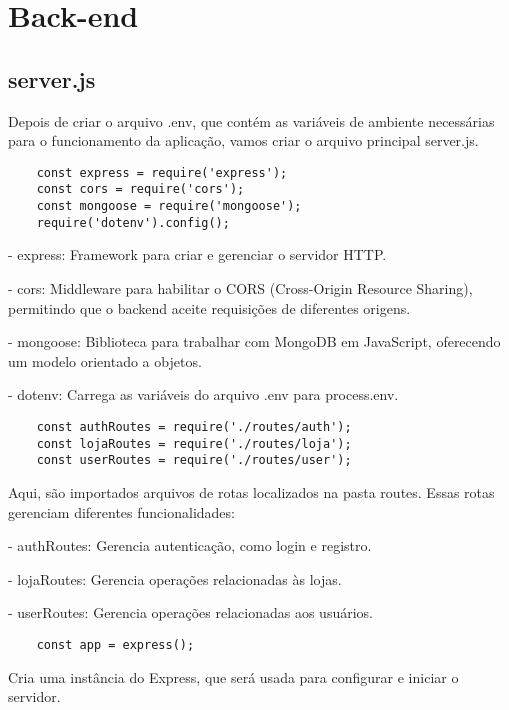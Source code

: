 \section{Back-end}

\subsection{server.js}
Depois de criar o arquivo .env, que contém as variáveis de ambiente necessárias para o funcionamento 
da aplicação, vamos criar o arquivo principal server.js.

\begin{lstlisting}
    const express = require('express');
    const cors = require('cors');
    const mongoose = require('mongoose');
    require('dotenv').config();
\end{lstlisting}

- express: Framework para criar e gerenciar o servidor HTTP.

- cors: Middleware para habilitar o CORS (Cross-Origin Resource Sharing), 
permitindo que o backend aceite requisições de diferentes origens.

- mongoose: Biblioteca para trabalhar com MongoDB em JavaScript, oferecendo um modelo orientado a objetos.

- dotenv: Carrega as variáveis do arquivo .env para process.env.

\begin{lstlisting}
    const authRoutes = require('./routes/auth');
    const lojaRoutes = require('./routes/loja');
    const userRoutes = require('./routes/user');
\end{lstlisting}

Aqui, são importados arquivos de rotas localizados na pasta routes. 
Essas rotas gerenciam diferentes funcionalidades:

- authRoutes: Gerencia autenticação, como login e registro.

- lojaRoutes: Gerencia operações relacionadas às lojas.

- userRoutes: Gerencia operações relacionadas aos usuários.

\vspace{1cm}
\begin{lstlisting}
    const app = express();
\end{lstlisting}   
\vspace{1cm}

Cria uma instância do Express, que será usada para configurar e iniciar o servidor.

